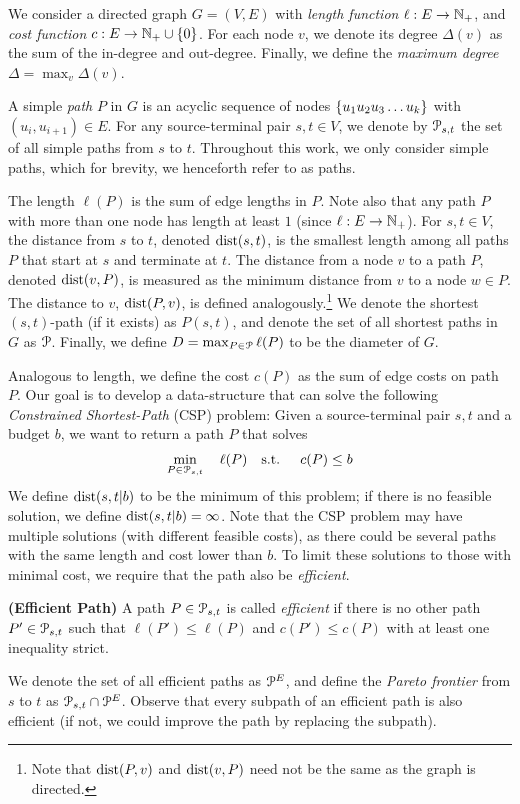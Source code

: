 
We consider a directed graph $G=(V,E)$ with \emph{length function} $\ell:E\to \N_+$, and \emph{cost function} $c:E\to \N_+\cup\{0\}$.
For each node $v$, we denote its degree $\Delta(v)$ as the sum of the in-degree and out-degree.
Finally, we define the \emph{maximum degree} $\Delta = \max_v\Delta(v)$.


A simple \emph{path} $P$ in $G$ is an acyclic sequence of nodes  $\crl*{u_1u_2u_3\ldots u_k}$ with $(u_i,u_{i+1})\in E$.
For any source-terminal pair $s,t\in V$, we denote by $\Pst$ the set of all simple paths from $s$ to $t$.
Throughout this work, we only consider simple paths, which for brevity, we henceforth refer to as paths.

The length $\ell(P)$ is the sum of edge lengths in $P$. Note also that any path $P$ with more than one node has length at least $1$ (since $\ell:E\to \N_+$).
For $s,t\in V$, the distance from $s$ to $t$, denoted $\dist(s,t)$, is the smallest length among all paths $P$ that start at $s$ and terminate at $t$.
The distance from a node $v$ to a path $P$, denoted $\dist(v,P)$, is measured as the minimum distance from $v$ to a node $w\in P$.
The distance to $v$, $\dist(P,v)$, is defined analogously.\footnote{Note that  $\dist(P,v)$ and  $\dist(v,P)$ need not be the same as the graph is directed.}
We denote the shortest $(s,t)$-path (if it exists) as $P(s,t)$, and denote the set of all shortest paths in $G$ as $\calP$.
Finally, we define $D=\max_{P\in\calP}\ell(P)$ to be the diameter of $G$.


Analogous to length, we define the cost $c(P)$ as the sum of edge costs on path $P$. 
Our goal is to develop a data-structure that can solve the following \emph{Constrained Shortest-Path} (CSP) problem: Given a source-terminal pair $s,t$ and a budget $b$, we want to return a path $P$ that solves
\begin{align*}
\min_{P \in \Pst}  \quad \ell(P) \quad
\text{s.t. } \quad  c(P) \leq b 
\end{align*}
We define $\dist(s,t|b)$ to be the minimum of this problem; if there is no feasible solution, we define $\dist(s,t|b)=\infty$.
Note that the CSP problem may have multiple solutions (with different feasible costs), as there could be several paths with the same length and cost lower than $b$.
To limit these solutions to those with minimal cost, we require that the path also be \emph{efficient}. 
\begin{definition}
\textbf{(Efficient Path)} A path $P\in \Pst$ is called \emph{efficient} if there is no other path $P'\in \Pst$ such that $\ell(P')\leq \ell(P)$ and $c(P')\leq c(P)$ with at least one inequality strict.
\end{definition}
We denote the set of all efficient paths as $\PE$, and define the \emph{Pareto frontier} from $s$ to $t$ as $\Pst\cap\PE$.
Observe that every subpath of an efficient path is also efficient (if not, we could improve the path by replacing the subpath).





